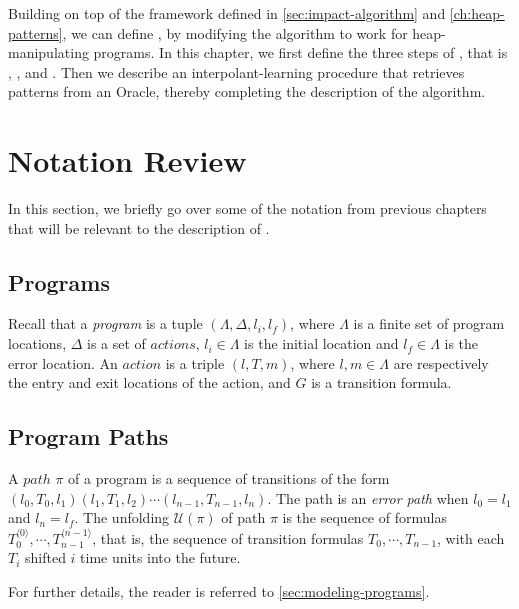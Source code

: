 
\label{ch:heap-impact-algorithm}
%

Building on top of the framework defined in \autoref{sec:impact-algorithm} and \autoref{ch:heap-patterns}, we can define \verifier, by modifying the \impact algorithm to work for heap-manipulating programs. In this chapter, we first define the three steps of \impact, that is \expand, \cover, and . Then we describe an interpolant-learning procedure that retrieves patterns from an Oracle, thereby completing the description of the algorithm.

\section{Notation Review}
In this section, we briefly go over some of the notation from previous chapters that will be relevant to the description of \verifier.

\subsection{Programs}
Recall that a \textit{program} is a tuple $(\Lambda, \Delta, l_i, l_f)$, where $\Lambda$ is a finite set of program locations, $\Delta$ is a set of $actions$, $l_i \in \Lambda$ is the initial location and $l_f \in \Lambda$ is the error location. An $action$ is a triple $(l, T, m)$, where $l,m \in \Lambda$ are respectively the entry and exit locations of the action, and $G$ is a transition formula.

\subsection{Program Paths}
A $path$ $\pi$ of a program is a sequence of transitions of the form $(l_0, T_0, l_1)(l_1, T_1, l_2) \cdots (l_{n-1}, T_{n-1}, l_n)$. The path is an \textit{error path} when $l_0 = l_1$ and $l_n = l_f$. The unfolding $\mathcal{U}(\pi)$ of path $\pi$ is the sequence of formulas $T_0^{\langle 0 \rangle}, \cdots, T_{n-1}^{\langle n-1 \rangle}$, that is, the sequence of transition formulas $T_0, \cdots, T_{n-1}$, with each $T_i$ shifted $i$ time units into the future.

For further details, the reader is referred to \autoref{sec:modeling-programs}.

